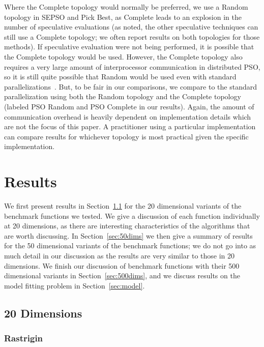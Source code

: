 \documentclass[smallcondensed]{svjour3}
\renewcommand{\sec}[1]{Section~\ref{sec:#1}}
\begin{document}
Where the Complete topology would normally be preferred, we use a Random
topology in SEPSO and Pick Best, as Complete leads to an explosion in the
number of speculative evaluations (as noted, the other speculative techniques
can still use a Complete topology; we often report results on both topologies
for those methods).  If speculative evaluation were not being performed, it is
possible that the Complete topology would be used.  However, the Complete
topology also requires a very large amount of interprocessor communication in
distributed PSO, so it is still quite possible that Random would be used even
with standard parallelizations~\cite{mcnabb-2009-large-particle-swarms}.  But,
to be fair in our comparisons, we compare to the standard parallelization using
both the Random topology and the Complete topology (labeled PSO Random and PSO
Complete in our results).  Again, the amount of communication overhead is
heavily dependent on implementation details which are not the focus of this
paper.  A practitioner using a particular implementation can compare results
for whichever topology is most practical given the specific implementation.

\section{Results}
\label{sec:results}

We first present results in \sec{20dims} for the 20 dimensional variants of the
benchmark functions we tested.  We give a discussion of each function
individually at 20 dimensions, as there are interesting characteristics of the
algorithms that are worth discussing.  In \sec{50dims} we then give a summary
of results for the 50 dimensional variants of the benchmark functions; we do
not go into as much detail in our discussion as the results are very similar to
those in 20 dimensions.  We finish our discussion of benchmark functions with
their 500 dimensional variants in \sec{500dims}, and we discuss results on the
model fitting problem in \sec{model}.

\subsection{20 Dimensions}
\label{sec:20dims}

\subsubsection{Rastrigin}
\end{document}
